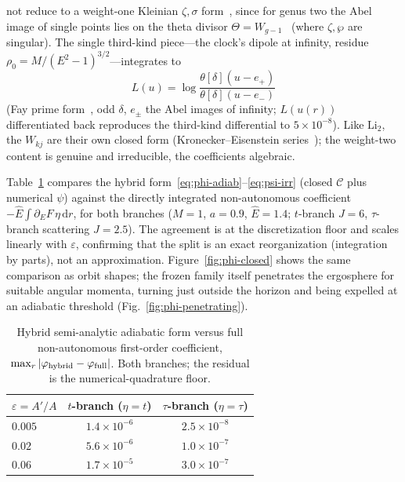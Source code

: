 \documentclass[
    aps, prd, twocolumn, superscriptaddress,
    showpacs, nofootinbib, floatfix
]{revtex4-2}
\newcommand{\Ehat}{\hat E}
\newcommand{\dd}{\mathrm{d}}
\begin{document}
not reduce to a weight-one Kleinian $\zeta,\sigma$
form~\cite{BakerAbelian1897,BuchstaberEnolskii1997}, since for genus two the Abel
image of single points lies on the theta divisor $\Theta=W_{g-1}$~\cite{MumfordTata}
(where $\zeta,\wp$ are singular). The single third-kind piece---the clock's dipole at
infinity, residue $\rho_0=M/(E^2-1)^{3/2}$---integrates to
\begin{equation}
    L(u)=\log\frac{\theta[\delta](u-e_+)}{\theta[\delta](u-e_-)}
    \label{eq:thirdkind-theta}
\end{equation}
(Fay prime form~\cite{Fay1973}, odd $\delta$, $e_\pm$ the Abel images of infinity;
$L(u(r))$ differentiated back reproduces the third-kind differential to
$5\times10^{-8}$). Like $\mathrm{Li}_2$, the $W_{kj}$ are their own closed form
(Kronecker--Eisenstein series~\cite{BeilinsonLevin1994}); the weight-two content is genuine and irreducible, the coefficients
algebraic.

Table~\ref{tab:adiab-valid} compares the hybrid
form~\eqref{eq:phi-adiab}--\eqref{eq:psi-irr} (closed $\mathcal{C}$ plus numerical
$\psi$) against the directly integrated non-autonomous coefficient
$-\Ehat\!\int\partial_E F\,\eta\,\dd r$, for both branches ($M=1$, $a=0.9$,
$\Ehat=1.4$; $t$-branch $J=6$, $\tau$-branch scattering $J=2.5$). The agreement is
at the discretization floor and scales linearly with $\varepsilon$, confirming
that the split is an exact reorganization (integration by parts), not an
approximation. Figure~\ref{fig:phi-closed} shows the same comparison as orbit
shapes; the frozen family itself penetrates the ergosphere for suitable angular
momenta, turning just outside the horizon and being expelled at an adiabatic
threshold (Fig.~\ref{fig:phi-penetrating}).
\begin{table}[htbp]
    \centering
    \caption{Hybrid semi-analytic adiabatic form versus full non-autonomous
    first-order coefficient, $\max_r|\varphi_{\rm hybrid}-\varphi_{\rm full}|$.
    Both branches; the residual is the numerical-quadrature floor.}
    \label{tab:adiab-valid}
    \begin{tabular}{lcc}
        \hline\hline
        $\varepsilon=A'/A$ & $t$-branch ($\eta=t$) & $\tau$-branch ($\eta=\tau$)\\
        \hline
        $0.005$ & $1.4\times10^{-6}$ & $2.5\times10^{-8}$\\
        $0.02$  & $5.6\times10^{-6}$ & $1.0\times10^{-7}$\\
        $0.06$  & $1.7\times10^{-5}$ & $3.0\times10^{-7}$\\
        \hline\hline
    \end{tabular}
\end{table}
\end{document}
